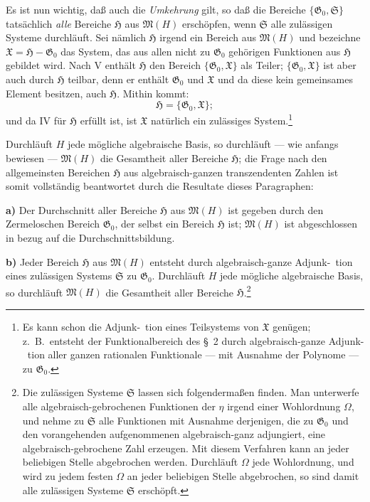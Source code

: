 \documentclass[12pt,a4paper]{article}
\begin{document}
Es ist nun wichtig, da\ss{} auch die \emph{Umkehrung} gilt, so da\ss{} die Bereiche $\{\mathfrak{G}_0, \mathfrak{S}\}$ tats\"achlich \emph{alle} Bereiche $\mathfrak{H}$ aus $\mathfrak{M}(H)$ ersch\"opfen, wenn $\mathfrak{S}$ alle zul\"assigen Systeme durchl\"auft. Sei n\"amlich $\mathfrak{H}$ irgend ein Bereich aus $\mathfrak{M}(H)$ und bezeichne $\mathfrak{X} = \mathfrak{H} - \mathfrak{G}_0$ das System, das aus allen nicht zu $\mathfrak{G}_0$ geh\"origen Funktionen aus $\mathfrak{H}$ gebildet wird. Nach V enth\"alt $\mathfrak{H}$ den Bereich $\{\mathfrak{G}_0, \mathfrak{X}\}$ als Teiler; $\{\mathfrak{G}_0, \mathfrak{X}\}$ ist aber auch durch $\mathfrak{H}$ teilbar, denn er enth\"alt $\mathfrak{G}_0$ und $\mathfrak{X}$ und da diese kein gemeinsames Element besitzen, auch $\mathfrak{H}$. Mithin kommt:
\[\mathfrak{H} = \{\mathfrak{G}_0, \mathfrak{X}\};\]
und da IV f\"ur $\mathfrak{H}$ erf\"ullt ist, ist $\mathfrak{X}$ nat\"urlich ein zul\"assiges System.\footnote{Es kann schon die Adjunk-\ tion eines Teilsystems von $\mathfrak{X}$ gen\"ugen; z.\ B.\ entsteht der Funktionalbereich des \S\ 2 durch algebraisch-ganze Adjunk-\ tion aller ganzen rationalen Funktionale --- mit Ausnahme der Polynome --- zu $\mathfrak{G}_0$.}

Durchl\"auft $H$ jede m\"ogliche algebraische Basis, so durchl\"auft --- wie anfangs bewiesen --- $\mathfrak{M}(H)$ die Gesamtheit aller Bereiche $\mathfrak{H}$; die Frage nach den allgemeinsten Bereichen $\mathfrak{H}$ aus algebraisch-ganzen transzendenten Zahlen ist somit vollst\"andig beantwortet durch die Resultate dieses Paragraphen:

\smallskip
\textbf{a)} Der Durchschnitt aller Bereiche $\mathfrak{H}$ aus $\mathfrak{M}(H)$ ist gegeben durch den Zermeloschen Bereich $\mathfrak{G}_0$, der selbst ein Bereich $\mathfrak{H}$ ist; $\mathfrak{M}(H)$ ist abgeschlossen in bezug auf die Durchschnittsbildung.

\smallskip
\textbf{b)} Jeder Bereich $\mathfrak{H}$ aus $\mathfrak{M}(H)$ entsteht durch algebraisch-ganze Adjunk-\ tion eines zul\"assigen Systems $\mathfrak{S}$ zu $\mathfrak{G}_0$. Durchl\"auft $H$ jede m\"ogliche algebraische Basis, so durchl\"auft $\mathfrak{M}(H)$ die Gesamtheit aller Bereiche $\mathfrak{H}$.\footnote{Die zul\"assigen Systeme $\mathfrak{S}$ lassen sich folgenderma\ss en finden. Man unterwerfe alle algebraisch-gebrochenen Funktionen der $\eta$ irgend einer Wohlordnung $\Omega$, und nehme zu $\mathfrak{S}$ alle Funktionen mit Ausnahme derjenigen, die zu $\mathfrak{G}_0$ und den vorangehenden aufgenommenen algebraisch-ganz adjungiert, eine algebraisch-gebrochene Zahl erzeugen. Mit diesem Verfahren kann an jeder beliebigen Stelle abgebrochen werden. Durchl\"auft $\Omega$ jede Wohlordnung, und wird zu jedem festen $\Omega$ an jeder beliebigen Stelle abgebrochen, so sind damit alle zul\"assigen Systeme $\mathfrak{S}$ ersch\"opft.}
\end{document}
